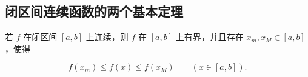 \documentclass[fontset=fandol]{ctexart}
\newenvironment{solution}{\par\noindent\textbf{解}\quad}{\hfill$\square$\par\vspace{0.8em}}
\begin{document}

\subsection*{闭区间连续函数的两个基本定理}



\begin{theorem}[有界性与最值定理]

若 $f$ 在闭区间 $[a,b]$ 上连续，则 $f$ 在 $[a,b]$ 上有界，并且存在 $x_m,x_M\in[a,b]$，使得

\[

f(x_m)\le f(x)\le f(x_M)\qquad (x\in[a,b]).

\]

\end{theorem}
\end{document}
